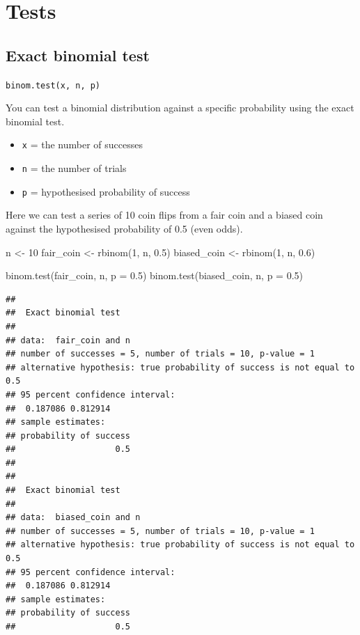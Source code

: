 \documentclass[
  oneside]{book}
\newenvironment{Shaded}{\begin{snugshade}}{\end{snugshade}}
\newcommand{\AttributeTok}[1]{\textcolor[rgb]{0.77,0.63,0.00}{#1}}
\newcommand{\DecValTok}[1]{\textcolor[rgb]{0.00,0.00,0.81}{#1}}
\newcommand{\FloatTok}[1]{\textcolor[rgb]{0.00,0.00,0.81}{#1}}
\newcommand{\FunctionTok}[1]{\textcolor[rgb]{0.00,0.00,0.00}{#1}}
\newcommand{\NormalTok}[1]{#1}
\newcommand{\OtherTok}[1]{\textcolor[rgb]{0.56,0.35,0.01}{#1}}
\providecommand{\tightlist}{%
  \setlength{\itemsep}{0pt}\setlength{\parskip}{0pt}}
\begin{document}
\hypertarget{tests}{%
\section{Tests}\label{tests}}

\hypertarget{exact-binom}{%
\subsection{Exact binomial test}\label{exact-binom}}

\texttt{binom.test(x,\ n,\ p)}

You can test a binomial distribution against a specific probability using the exact binomial test.

\begin{itemize}
\tightlist
\item
  \texttt{x} = the number of successes
\item
  \texttt{n} = the number of trials
\item
  \texttt{p} = hypothesised probability of success
\end{itemize}

Here we can test a series of 10 coin flips from a fair coin and a biased coin against the hypothesised probability of 0.5 (even odds).

\begin{Shaded}
\begin{Highlighting}[]
\NormalTok{n }\OtherTok{\textless{}{-}} \DecValTok{10}
\NormalTok{fair\_coin }\OtherTok{\textless{}{-}} \FunctionTok{rbinom}\NormalTok{(}\DecValTok{1}\NormalTok{, n, }\FloatTok{0.5}\NormalTok{)}
\NormalTok{biased\_coin }\OtherTok{\textless{}{-}} \FunctionTok{rbinom}\NormalTok{(}\DecValTok{1}\NormalTok{, n, }\FloatTok{0.6}\NormalTok{)}

\FunctionTok{binom.test}\NormalTok{(fair\_coin, n, }\AttributeTok{p =} \FloatTok{0.5}\NormalTok{)}
\FunctionTok{binom.test}\NormalTok{(biased\_coin, n, }\AttributeTok{p =} \FloatTok{0.5}\NormalTok{)}
\end{Highlighting}
\end{Shaded}

\begin{verbatim}
## 
##  Exact binomial test
## 
## data:  fair_coin and n
## number of successes = 5, number of trials = 10, p-value = 1
## alternative hypothesis: true probability of success is not equal to 0.5
## 95 percent confidence interval:
##  0.187086 0.812914
## sample estimates:
## probability of success 
##                    0.5 
## 
## 
##  Exact binomial test
## 
## data:  biased_coin and n
## number of successes = 5, number of trials = 10, p-value = 1
## alternative hypothesis: true probability of success is not equal to 0.5
## 95 percent confidence interval:
##  0.187086 0.812914
## sample estimates:
## probability of success 
##                    0.5
\end{verbatim}
\end{document}
